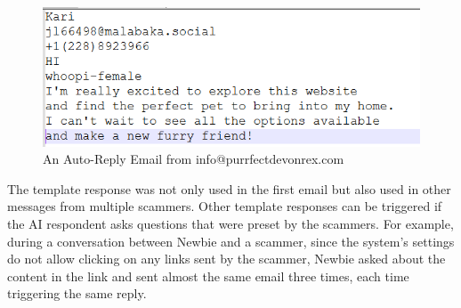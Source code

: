 \documentclass[ oneside,%
                    author={Cassie Qing Tang},
                    degree={BSc},
                     title={An Automated Response System for Disrupting Online Pet Scamming \\ },
                    subtitle={ }]{dissertation}
\begin{document}
\begin{figure}[H]
\centering
\includegraphics[width=0.35\linewidth]{pic/figure14.png}
\caption{An Auto-Reply Email from info@purrfectdevonrex.com}
\label{fig:pic14}
\end{figure}
The template response was not only used in the first email but also used in other messages from multiple scammers. Other template responses can be triggered if the AI respondent asks questions that were preset by the scammers. For example, during a conversation between Newbie and a scammer, since the system's settings do not allow clicking on any links sent by the scammer, Newbie asked about the content in the link and sent almost the same email three times, each time triggering the same reply.
\\
\end{document}
